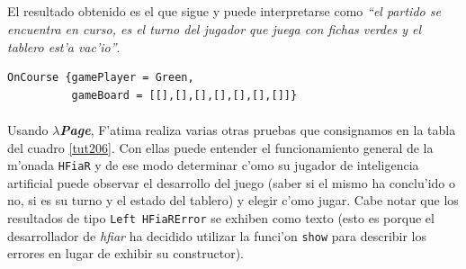 \documentclass[a4paper]{article}
\newcommand{\hpage}{\textbf{\textsl{$\lambda$Page}}}
\begin{document}
\subparagraph{}El resultado obtenido es el que sigue y puede interpretarse como \textsl{``el partido se encuentra en curso, es el turno del jugador que juega con fichas verdes y el tablero est'a vac'io''}.
\begin{center}\begin{lstlisting}
OnCourse {gamePlayer = Green,
          gameBoard = [[],[],[],[],[],[],[]]}
\end{lstlisting}\end{center}
\newpage
\paragraph{}Usando \hpage, F'atima realiza varias otras pruebas que consignamos en la tabla del cuadro \ref{tut206}.  Con ellas puede entender el funcionamiento general de la m'onada \texttt{HFiaR} y de ese modo determinar c'omo su jugador de inteligencia artificial puede observar el desarrollo del juego (saber si el mismo ha conclu'ido o no, si es su turno y el estado del tablero) y elegir c'omo jugar.  Cabe notar que los resultados de tipo \texttt{Left HFiaRError} se exhiben como texto (esto es porque el desarrollador de \textsl{hfiar} ha decidido utilizar la funci'on \texttt{show} para describir los errores en lugar de exhibir su constructor).
\end{document}

